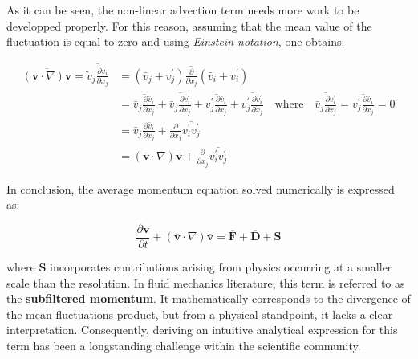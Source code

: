As it can be seen, the non-linear advection term needs more work to be developped properly. For this reason, assuming that the mean value of the fluctuation is equal to zero and using \textit{Einstein notation}, one obtains:

\begin{spreadlines}{1em}
\begin{equation*}
\begin{aligned}
\overline{(\mathbf{v} \cdot \nabla) \mathbf{v}} = \overline{\tilde{v}_j \frac{\partial \tilde{v}_i}{\partial x_j}} &=\overline{\left(\bar{v}_j+v_j^{\prime}\right) \frac{\partial}{\partial x_j}\left(\bar{v}_i+v_i^{\prime}\right)} \\&=\overline{\bar{v}_j \frac{\partial \bar{v}_i}{\partial x_j}}+\overline{\bar{v}_j \frac{\partial v_i^{\prime}}{\partial x_j}}+\overline{v_j^{\prime} \frac{\partial \bar{v}_i}{\partial x_j}}+\overline{v_j^{\prime} \frac{\partial v_i^{\prime}}{\partial x_j}} \hspace{1em} \text{where} \hspace{1em}  \overline{\bar{v}_j \frac{\partial v_i^{\prime}}{\partial x_j}} = \overline{v_j^{\prime} \frac{\partial \bar{v}_i}{\partial x_j}}  = 0\\
        &=\bar{v}_j \frac{\partial \bar{v}_i}{\partial x_j}+\frac{\partial}{\partial x_j} \overline{v_i^{\prime} v_j^{\prime}}\\
        &=  (\overline{\mathbf{v}} \cdot \nabla) \overline{\mathbf{v}} +\frac{\partial}{\partial x_j} \overline{v_i^{\prime} v_j^{\prime}}
\end{aligned} 
\end{equation*}
\end{spreadlines}

In conclusion, the average momentum equation solved numerically is expressed as:

\begin{equation}
\frac{\partial \overline{\mathbf{v}}}{\partial t} + (\overline{\mathbf{v}} \cdot \nabla) \overline{\mathbf{v}} = \overline{\mathbf{F}} + \overline{\mathbf{D}} + \mathbf{S}
\label{C2 - EQ - Reynolds stresses}
\end{equation}
\vspace{-0.5em}

where $\mathbf{S}$ incorporates contributions arising from physics occurring at a smaller scale than the resolution. In fluid mechanics literature, this term is referred to as the \textbf{subfiltered momentum}. It mathematically corresponds to the divergence of the mean fluctuations product, but from a physical standpoint, it lacks a clear interpretation. Consequently, deriving an intuitive analytical expression for this term has been a longstanding challenge within the scientific community.\\


